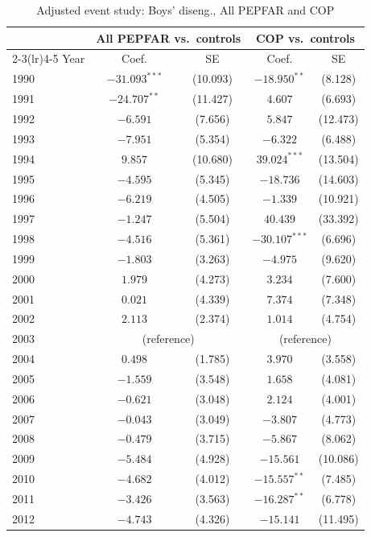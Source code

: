 \begin{table}[htbp]
\centering
\small
\caption{Adjusted event study: Boys' diseng., All PEPFAR and COP}
\label{tab:crown_es_combined_prim_disengage_boys}
\begin{tabular}{lcccc}
\toprule
 & \multicolumn{2}{c}{All PEPFAR vs.\ controls} & \multicolumn{2}{c}{COP vs.\ controls} \\
\cmidrule(lr){2-3}\cmidrule(lr){4-5}
Year & Coef. & SE & Coef. & SE \\
\midrule
1990 & $-31.093^{***}$ & (10.093) & $-18.950^{**}$ & (8.128) \\
1991 & $-24.707^{**}$ & (11.427) & $4.607$ & (6.693) \\
1992 & $-6.591$ & (7.656) & $5.847$ & (12.473) \\
1993 & $-7.951$ & (5.354) & $-6.322$ & (6.488) \\
1994 & $9.857$ & (10.680) & $39.024^{***}$ & (13.504) \\
1995 & $-4.595$ & (5.345) & $-18.736$ & (14.603) \\
1996 & $-6.219$ & (4.505) & $-1.339$ & (10.921) \\
1997 & $-1.247$ & (5.504) & $40.439$ & (33.392) \\
1998 & $-4.516$ & (5.361) & $-30.107^{***}$ & (6.696) \\
1999 & $-1.803$ & (3.263) & $-4.975$ & (9.620) \\
2000 & $1.979$ & (4.273) & $3.234$ & (7.600) \\
2001 & $0.021$ & (4.339) & $7.374$ & (7.348) \\
2002 & $2.113$ & (2.374) & $1.014$ & (4.754) \\
2003 & \multicolumn{2}{c}{(reference)} & \multicolumn{2}{c}{(reference)} \\
2004 & $0.498$ & (1.785) & $3.970$ & (3.558) \\
2005 & $-1.559$ & (3.548) & $1.658$ & (4.081) \\
2006 & $-0.621$ & (3.048) & $2.124$ & (4.001) \\
2007 & $-0.043$ & (3.049) & $-3.807$ & (4.773) \\
2008 & $-0.479$ & (3.715) & $-5.867$ & (8.062) \\
2009 & $-5.484$ & (4.928) & $-15.561$ & (10.086) \\
2010 & $-4.682$ & (4.012) & $-15.557^{**}$ & (7.485) \\
2011 & $-3.426$ & (3.563) & $-16.287^{**}$ & (6.778) \\
2012 & $-4.743$ & (4.326) & $-15.141$ & (11.495) \\

\end{tabular}
\end{table}

